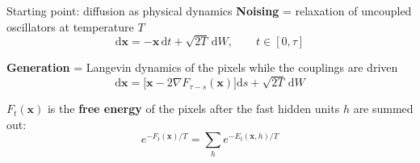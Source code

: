 \documentclass[aspectratio=169,10pt]{beamer}
\newcommand{\x}{\bm{x}}
\begin{document}
\begin{frame}{Starting point: diffusion as physical dynamics}
  \vspace{0.2cm}
  \textbf{Noising} = relaxation of uncoupled oscillators at temperature $T$
  \[
    \mathrm{d}\x=-\x\,\mathrm{d}t+\sqrt{2T}\,\mathrm{d}W ,\qquad t\in[0,\tau]
  \]
  \vspace{0.1cm}

  \textbf{Generation} = Langevin dynamics of the pixels while the couplings are driven
  \[
    \mathrm{d}\x=\bigl[\x-2\nabla F_{\tau-s}(\x)\bigr]\mathrm{d}s+\sqrt{2T}\,\mathrm{d}W
  \]
  \vspace{0.1cm}

  $F_t(\x)$ is the \textbf{free energy} of the pixels after the fast hidden units $h$ are summed out:
  \[
    e^{-F_t(\x)/T}=\sum_{h}e^{-E_t(\x,h)/T}
  \]
\end{frame}
\end{document}

